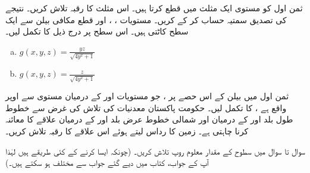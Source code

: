 \quad
ثمن اول کو مستوی  ایک مثلث  میں قطع کرتا  ہیں۔ اس مثلث کا رقبہ تلاش کریں۔ نتیجے کی تصدیق سمتیہ حساب کر کے کریں۔
\quad
مستویات ، ، اور  قطع مکافی بیلن   سے ایک سطح  کاٹتی ہیں۔ اس سطح پر  درج ذیل کا تکمل لیں۔
\begin{enumerate}[a.]
\item
\(g(x,y,z)=\frac{yz}{\sqrt{4y^2+1}}\)
\item
\(g(x,y,z)=\frac{z}{\sqrt{4y^2+1}}\)
\end{enumerate}
\quad
ثمن اول میں بیلن  کے اس حصے پر ، جو مستویات  اور  کے درمیان    مستوی  سے اوپر واقع ہے  ،  کا تکمل لیں۔
حکومت پاکستان معدنیات کی تلاش کی غرض  سے خطوط طول  بلد   اور  کے  درمیان اور   شمالی خطوط  عرض بلد  اور   کے درمیان    علاقے کا معائنہ کرنا چاہتی ہے۔  زمین کا رداس  لیتے ہوئے اس علاقے کا رقبہ تلاش کریں۔

سوال   تا سوال    میں سطوح کے مقدار معلوم روپ تلاش کریں۔ (چونکہ ایسا کرنے کے کئی طریقے ہیں لہٰذا آپ کے جواب، کتاب میں دیے گئے  جواب سے مختلف ہو سکتے ہیں۔)

